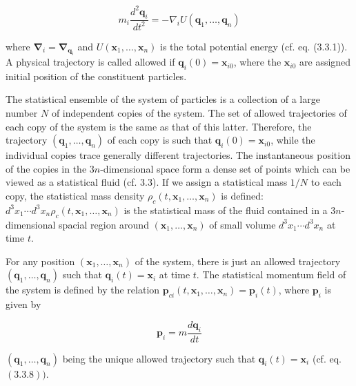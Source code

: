\documentclass{article}
\begin{document}
\begin{equation*}
m_{i} \frac{d^{2} \boldsymbol{q}_{i}}{d t^{2}}=-\nabla_{i} U\left(\boldsymbol{q}_{1}, \ldots, \boldsymbol{q}_{n}\right) \tag{3.20.1}
\end{equation*}
 
where $\boldsymbol{\nabla}_{i}=\boldsymbol{\nabla}_{\boldsymbol{q}_{i}}$ and $U\left(\boldsymbol{x}_{1}, \ldots, \boldsymbol{x}_{n}\right)$ is the total potential energy (cf. eq. (3.3.1)). A physical trajectory is called allowed if $\boldsymbol{q}_{i}(0)=\boldsymbol{x}_{i 0}$, where the $\boldsymbol{x}_{i 0}$ are assigned initial position of the constituent particles.

The statistical ensemble of the system of particles is a collection of a large number $N$ of independent copies of the system. The set of allowed trajectories
of each copy of the system is the same as that of this latter. Therefore, the trajectory $\left(\boldsymbol{q}_{1}, \ldots, \boldsymbol{q}_{n}\right)$ of each copy is such that $\boldsymbol{q}_{i}(0)=\boldsymbol{x}_{i 0}$, while the individual copies trace generally different trajectories. The instantaneous position of the copies in the $3 n$-dimensional space form a dense set of points which can be viewed as a statistical fluid (cf. 3.3). If we assign a statistical mass $1 / N$ to each copy, the statistical mass density $\rho_{c}\left(t, \boldsymbol{x}_{1}, \ldots, \boldsymbol{x}_{n}\right)$ is defined: $d^{3} x_{1} \cdots d^{3} x_{n} \rho_{c}\left(t, \boldsymbol{x}_{1}, \ldots, \boldsymbol{x}_{n}\right)$ is the statistical mass of the fluid contained in a $3 n$-dimensional spacial region around $\left(\boldsymbol{x}_{1}, \ldots, \boldsymbol{x}_{n}\right)$ of small volume $d^{3} x_{1} \cdots d^{3} x_{n}$ at time $t$.

For any position $\left(\boldsymbol{x}_{1}, \ldots, \boldsymbol{x}_{n}\right)$ of the system, there is just an allowed trajectory $\left(\boldsymbol{q}_{1}, \ldots, \boldsymbol{q}_{n}\right)$ such that $\boldsymbol{q}_{i}(t)=\boldsymbol{x}_{i}$ at time $t$. The statistical momentum field of the system is defined by the relation $\boldsymbol{p}_{c i}\left(t, \boldsymbol{x}_{1}, \ldots, \boldsymbol{x}_{n}\right)=\boldsymbol{p}_{i}(t)$, where $\boldsymbol{p}_{i}$ is given by
 
\begin{equation*}
\boldsymbol{p}_{i}=m \frac{d \boldsymbol{q}_{i}}{d t} \tag{3.20.2}
\end{equation*}
 
$\left(\boldsymbol{q}_{1}, \ldots, \boldsymbol{q}_{n}\right)$ being the unique allowed trajectory such that $\boldsymbol{q}_{i}(t)=\boldsymbol{x}_{i}$ (cf. eq. $(3.3 .8))$.
\end{document}
